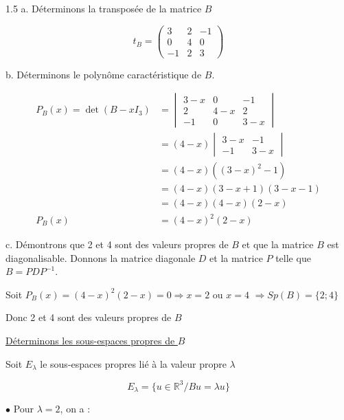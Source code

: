 \documentclass[12pt]{article}
\begin{document}
\begin{spacing}{1.5}
a. Déterminons la transposée de la matrice $B$

\[t_B=\begin{pmatrix}
3 & 2 & -1 \\ 
0 & 4 & 0 \\ 
-1 & 2 & 3
\end{pmatrix}
\]

b. Déterminons le polynôme caractéristique de $B$.



\begin{align*}
P_B(x)=\det(B-xI_3)&=\begin{vmatrix}
3-x & 0 & -1 \\ 
2 & 4-x & 2 \\ 
-1 & 0 & 3-x
\end{vmatrix} \\
&=(4-x)\begin{vmatrix}
3-x & -1 \\ 
-1 & 3-x
\end{vmatrix}\\
&=(4-x)((3-x)^2-1)\\
&=(4-x)(3-x+1)(3-x-1)\\
&=(4-x)(4-x)(2-x)\\
P_B(x)&=(4-x)^2(2-x)
\end{align*}


c. Démontrons que 2 et 4 sont des valeurs propres de $B$ et que la matrice $B$ est diagonalisable. Donnons la matrice diagonale $D$ et la matrice $P$ telle que $B=PDP^{-1}$.

Soit $P_B(x)=(4-x)^2(2-x)=0\Rightarrow x=2$ ou $x=4$ $\Longrightarrow Sp(B)=\{2;4\}$

Donc 2 et 4 sont des valeurs propres de $B$

\underline{Déterminons les sous-espaces propres de $B$}

Soit $E_\lambda$ le sous-espaces propres lié à la valeur propre $\lambda$

\[
E_\lambda=\{u\in \mathbb{R}^3/Bu=\lambda u\}
\]

\medskip
$\bullet$ Pour $\lambda=2$, on a :


\end{spacing}
\end{document}
